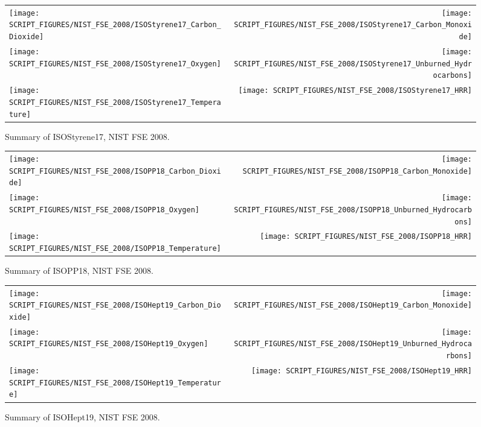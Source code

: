 \begin{figure}[p]
\begin{tabular*}{\textwidth}{l@{\extracolsep{\fill}}r}
\texttt{[image: SCRIPT\_FIGURES/NIST\_FSE\_2008/ISOStyrene17\_Carbon\_Dioxide]} &
\texttt{[image: SCRIPT\_FIGURES/NIST\_FSE\_2008/ISOStyrene17\_Carbon\_Monoxide]} \\
\texttt{[image: SCRIPT\_FIGURES/NIST\_FSE\_2008/ISOStyrene17\_Oxygen]} &
\texttt{[image: SCRIPT\_FIGURES/NIST\_FSE\_2008/ISOStyrene17\_Unburned\_Hydrocarbons]} \\
\texttt{[image: SCRIPT\_FIGURES/NIST\_FSE\_2008/ISOStyrene17\_Temperature]} &
\texttt{[image: SCRIPT\_FIGURES/NIST\_FSE\_2008/ISOStyrene17\_HRR]}
\end{tabular*}
\caption[Summary of ISOStyrene17, NIST FSE 2008]{Summary of ISOStyrene17, NIST FSE 2008.}
\label{NIST_FSE_1994_ISOStyrene17}
\end{figure}


\begin{figure}[p]
\begin{tabular*}{\textwidth}{l@{\extracolsep{\fill}}r}
\texttt{[image: SCRIPT\_FIGURES/NIST\_FSE\_2008/ISOPP18\_Carbon\_Dioxide]} &
\texttt{[image: SCRIPT\_FIGURES/NIST\_FSE\_2008/ISOPP18\_Carbon\_Monoxide]} \\
\texttt{[image: SCRIPT\_FIGURES/NIST\_FSE\_2008/ISOPP18\_Oxygen]} &
\texttt{[image: SCRIPT\_FIGURES/NIST\_FSE\_2008/ISOPP18\_Unburned\_Hydrocarbons]} \\
\texttt{[image: SCRIPT\_FIGURES/NIST\_FSE\_2008/ISOPP18\_Temperature]} &
\texttt{[image: SCRIPT\_FIGURES/NIST\_FSE\_2008/ISOPP18\_HRR]}
\end{tabular*}
\caption[Summary of ISOPP18, NIST FSE 2008]{Summary of ISOPP18, NIST FSE 2008.}
\label{NIST_FSE_1994_ISOPP18}
\end{figure}

\begin{figure}[p]
\begin{tabular*}{\textwidth}{l@{\extracolsep{\fill}}r}
\texttt{[image: SCRIPT\_FIGURES/NIST\_FSE\_2008/ISOHept19\_Carbon\_Dioxide]} &
\texttt{[image: SCRIPT\_FIGURES/NIST\_FSE\_2008/ISOHept19\_Carbon\_Monoxide]} \\
\texttt{[image: SCRIPT\_FIGURES/NIST\_FSE\_2008/ISOHept19\_Oxygen]} &
\texttt{[image: SCRIPT\_FIGURES/NIST\_FSE\_2008/ISOHept19\_Unburned\_Hydrocarbons]} \\
\texttt{[image: SCRIPT\_FIGURES/NIST\_FSE\_2008/ISOHept19\_Temperature]} &
\texttt{[image: SCRIPT\_FIGURES/NIST\_FSE\_2008/ISOHept19\_HRR]}
\end{tabular*}
\caption[Summary of ISOHept19, NIST FSE 2008]{Summary of ISOHept19, NIST FSE 2008.}
\label{NIST_FSE_1994_ISOHept19}
\end{figure}

